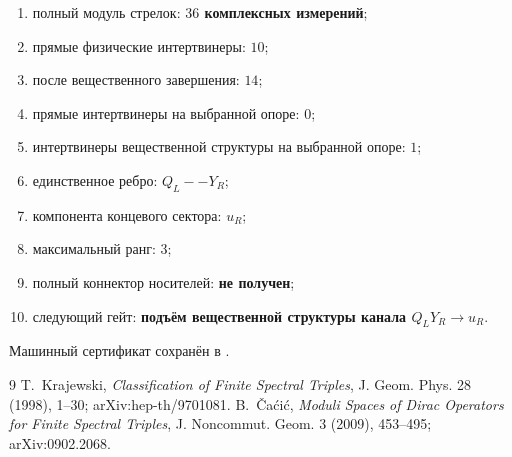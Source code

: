 \begin{protocol}
\begin{enumerate}
 \item полный модуль стрелок: \textbf{$36$ комплексных измерений};
 \item прямые физические интертвинеры: \textbf{$10$};
 \item после вещественного завершения: \textbf{$14$};
 \item прямые интертвинеры на выбранной опоре: \textbf{$0$};
 \item интертвинеры вещественной структуры на выбранной опоре: \textbf{$1$};
 \item единственное ребро: \textbf{$Q_L--Y_R$};
 \item компонента концевого сектора: \textbf{$u_R$};
 \item максимальный ранг: \textbf{$3$};
 \item полный коннектор носителей: \textbf{не получен};
 \item следующий гейт: \textbf{подъём вещественной структуры канала $Q_LY_R\to u_R$}.
\end{enumerate}
\end{protocol}

Машинный сертификат сохранён в
.

\begin{thebibliography}{9}
T.~Krajewski, \emph{Classification of Finite Spectral Triples},
J. Geom. Phys. 28 (1998), 1--30; arXiv:hep-th/9701081.
B.~\v{C}a\'ci\'c, \emph{Moduli Spaces of Dirac Operators for Finite
Spectral Triples}, J. Noncommut. Geom. 3 (2009), 453--495;
arXiv:0902.2068.
\end{thebibliography}